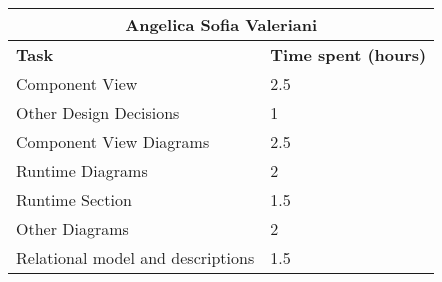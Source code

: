 \begin{table}[H]
  \center
  \begin{tabular}{l|l}
    \multicolumn{2}{c}{\textbf{Angelica Sofia Valeriani}} \\
    \hline
    \textbf{Task} & \textbf{Time spent (hours)}\\
    \hline
    Component View & 2.5 \\
    Other Design Decisions & 1 \\
    Component View Diagrams & 2.5 \\
    Runtime Diagrams & 2 \\
    Runtime Section & 1.5 \\
    Other Diagrams & 2 \\
    Relational model and descriptions & 1.5 \\
  \end{tabular}
\end{table}